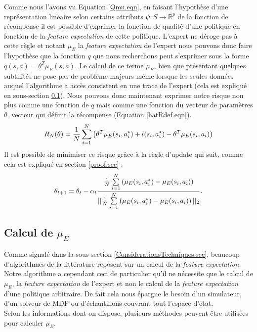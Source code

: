 \documentclass[publibook-draft]{CAp2012}
\begin{document}
Comme nous l'avons vu Equation \ref{Qmu.eqn}, en faisant l'hypothèse d'une représentation linéaire selon certains attributs $\psi : S\rightarrow \mathbb{R}^p$ de la fonction de récompense il est possible d'exprimer la fonction de qualité d'une politique en fonction de la {\it feature expectation} de cette politique. L'expert ne déroge pas à cette règle et notant $\mu_E$ la {\it feature expectation} de l'expert nous pouvons donc faire l'hypothèse que la fonction $q$ que nous recherchons peut s'exprimer sous la forme $q(s,a) = \theta^T\mu_E(s,a)$. Le calcul de ce terme $\mu_E$, bien que présentant quelques subtilités ne pose pas de problème majeurs même lorsque les seules données auquel l'algorithme a accès consistent en une trace de l'expert (cela est expliqué en sous-section \ref{calculmu.sec}). Nous pouvons donc maintenant exprimer notre risque non plus comme une fonction de $q$ mais comme une fonction du vecteur de paramètres $\theta$, vecteur qui définit la récompense (Equation \ref{hatRdef.eqn}).
   \begin{equation}
   R_N(\theta) = {1\over N} \sum_{i=1}^N\left(\theta ^T \mu_E(s_i,a^*_i) + l(s_i,a^*_i) - \theta ^T \mu_E(s_i,a_i) \right)
   \end{equation}
   Il est possible de minimiser ce risque grâce à la règle d'update qui suit, comme cela est expliqué en section \ref{proof.sec} :
   \begin{equation}
   \theta_{t+1} = \theta_t -\alpha_t{{1\over N}\sum\limits_{i=1}^N\left(\mu_E(s_i,a^*_i) - \mu_E(s_i,a_i)\right)\over ||{1\over N}\sum\limits_{i=1}^N\left(\mu_E(s_i,a^*_i) - \mu_E(s_i,a_i)\right)||_2}.
   \end{equation}
\subsection{Calcul de $\mu_E$}
\label{calculmu.sec}
Comme signalé dans la sous-section \ref{ConsiderationsTechniques.sec}, beaucoup d'algorithmes de la littérature reposent sur un calcul de la {\it feature expectation}. Notre algorithme a cependant ceci de particulier qu'il ne nécessite que le calcul de $\mu_E$, la {\it feature expectation} de l'expert et non le calcul de la {\it feature expectation} d'une politique arbitraire. De fait cela nous épargne le besoin d'un simulateur, d'un solveur de MDP ou d'échantillons couvrant tout l'espace d'état.\\

Selon les informations dont on dispose, plusieurs méthodes peuvent être utilisées pour calculer $\mu_E$.\\
\end{document}
